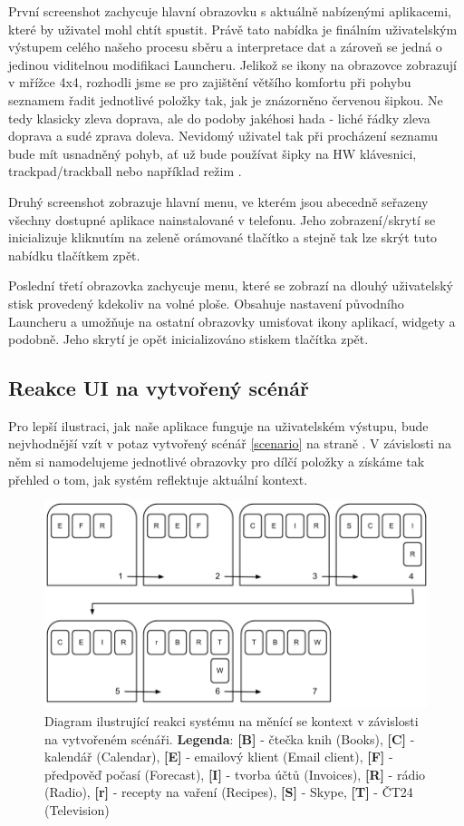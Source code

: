 \documentclass[thesis=M,czech]{FITthesis}[2012/06/26]
\begin{document}
První screenshot zachycuje hlavní obrazovku s aktuálně nabízenými aplikacemi, které by uživatel mohl chtít spustit. Právě tato nabídka je finálním uživatelským výstupem celého našeho procesu sběru a interpretace dat a zároveň se jedná o jedinou viditelnou modifikaci Launcheru. Jelikož se ikony na obrazovce zobrazují v mřížce 4x4, rozhodli jsme se pro zajištění většího komfortu při pohybu seznamem řadit jednotlivé položky tak, jak je znázorněno červenou šipkou. Ne tedy klasicky zleva doprava, ale do podoby jakéhosi hada - liché řádky zleva doprava a sudé zprava doleva. Nevidomý uživatel tak při procházení seznamu bude mít usnadněný pohyb, ať už bude používat šipky na HW klávesnici, trackpad/trackball nebo například režim \cite{explore_by_touch}.

Druhý screenshot zobrazuje hlavní menu, ve kterém jsou abecedně seřazeny všechny dostupné aplikace nainstalované v telefonu. Jeho zobraze\-ní/skrytí se inicializuje kliknutím na zeleně orámované tlačítko a stejně tak lze skrýt tuto nabídku tlačítkem zpět.

Poslední třetí obrazovka zachycuje menu, které se zobrazí na dlouhý uživatelský stisk provedený kdekoliv na volné ploše. Obsahuje nastavení původního Launcheru a umožňuje na ostatní obrazovky umisťovat ikony aplikací, widgety a podobně. Jeho skrytí je opět inicializováno stiskem tlačítka zpět.

\subsection{Reakce UI na vytvořený scénář}
Pro lepší ilustraci, jak naše aplikace funguje na uživatelském výstupu, bude nejvhodnější vzít v potaz vytvořený scénář \ref{scenario} na straně \pageref{scenario}. V závislosti na něm si namodelujeme jednotlivé obrazovky pro dílčí položky a získáme tak přehled o tom, jak systém reflektuje aktuální kontext.

\begin{figure}\centering
	\includegraphics[width=1\textwidth]{figures/screens}
	\caption{Diagram ilustrující reakci systému na měnící se kontext v závislosti na vytvořeném scénáři. \textbf{Legenda}: \textbf{[B]} - čtečka knih (Books), \textbf{[C]} - kalendář (Calendar), \textbf{[E]} - emailový klient (Email client), \textbf{[F]} - předpověď počasí (Forecast), \textbf{[I]} - tvorba účtů (Invoices), \textbf{[R]} - rádio (Radio), \textbf{[r]} - recepty na vaření (Recipes), \textbf{[S]} - Skype, \textbf{[T]} - ČT24 (Television)}
	\label{fig:screens}
\end{figure}
\end{document}
